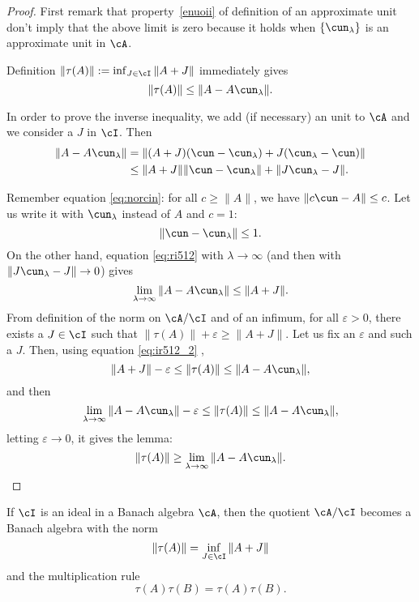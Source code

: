 \begin{proof}
	First remark that property~\ref{enuoii} of definition of an approximate unit don't imply that the above limit is zero because it holds when $\{ \cun_{\lambda} \}$ is an approximate unit in $\cA$.

	Definition $\| \tau(A) \|:=\inf_{J\in\cI}\| A+J \|$ immediately gives
	\begin{equation} \label{eq:ir512_2}
		\|\tau(A)\|\leq \| A-A\cun_{\lambda} \|.
	\end{equation}

	In order to prove the inverse inequality, we add (if necessary) an unit to $\cA$ and we consider a $J$ in $\cI$. Then
	\begin{equation} \label{eq:ri512}
		\begin{split}
			\| A-A\cun_{\lambda} \|&=\| (A+J)(\cun-\cun_{\lambda})+J(\cun_{\lambda}-\cun) \|\\
			&\leq \| A+J \|\| \cun-\cun_{\lambda} \|+\| J\cun_{\lambda}-J \|.
		\end{split}
	\end{equation}

	Remember equation \eqref{eq:norcin}: for all $c\geq \| A \|$, we have $\| c\cun-A \|\leq c$. Let us write it  with $\cun_{\lambda}$ instead of $A$ and $c=1$:
	\[
		\| \cun-\cun_{\lambda} \|\leq 1.
	\]
	On the other hand, equation \eqref{eq:ri512} with $\lambda\to\infty$ (and then with $\| J\cun_{\lambda}-J \|\to 0$) gives
	\[
		\lim_{\lambda\to\infty}\| A-A\cun_{\lambda} \|\leq\| A+J \|.
	\]
	From definition of the norm on $\cA/\cI$ and of an infimum, for all $\varepsilon>0$, there exists a $J\in \cI$ such that $\| \tau(A) \|+\varepsilon\geq\| A+J \|$. Let us fix an $\varepsilon$ and such a $J$. Then, using equation \eqref{eq:ir512_2} ,
	\[
		\| A+J \|-\varepsilon\leq\| \tau(A) \|\leq\| A-A\cun_{\lambda} \|,
	\]
	and then
	\[
		\lim_{\lambda\to\infty}\| A-A\cun_{\lambda} \|-\varepsilon \leq\| \tau(A) \|\leq\| A-A\cun_{\lambda} \|,
	\]
	letting $\varepsilon\to 0$, it gives the lemma:
	\[
		\| \tau(A) \|\geq \lim_{\lambda\to\infty}\| A-A\cun_{\lambda} \|.
	\]
\end{proof}

\begin{proposition} \label{prop:ideal_Banach}
	If $\cI$ is an ideal in a Banach algebra $\cA$, then the quotient $\cA/\cI$ becomes a Banach algebra with the norm
	\begin{equation}  \label{eq:norm_ideal}
		\|\tau(A)\|=\inf_{J\in\cI}\|A+J\|
	\end{equation}
	and the multiplication rule
	\begin{equation}   \label{eq:prod_ideal}
		\tau(A)\tau(B)=\tau(A)\tau(B).
	\end{equation}
\end{proposition}

